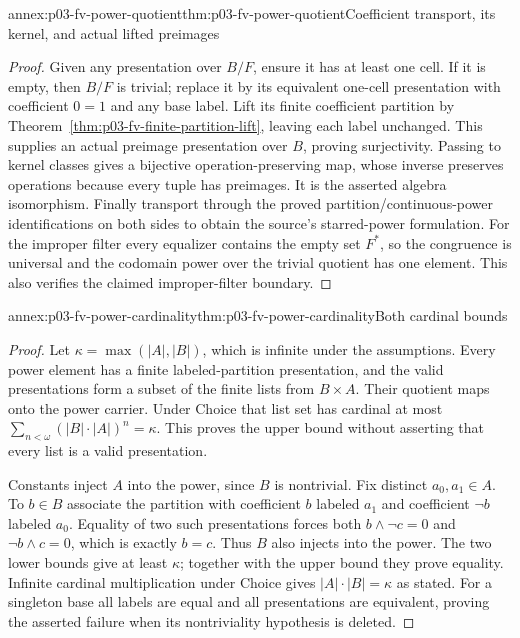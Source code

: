 \begin{annexitem}{annex:p03-fv-power-quotient}{thm:p03-fv-power-quotient}{Coefficient transport, its kernel, and actual lifted preimages}
\begin{proof}
Given any presentation over \(B/F\), ensure it has at least one cell.
If it is empty, then \(B/F\) is trivial; replace it by its equivalent
one-cell presentation with coefficient \(0=1\) and any base label.
Lift its finite coefficient
partition by Theorem~\ref{thm:p03-fv-finite-partition-lift}, leaving
each label unchanged. This supplies an actual preimage presentation over
\(B\), proving surjectivity. Passing to kernel classes gives a bijective
operation-preserving map, whose inverse preserves operations because every
tuple has preimages. It is the asserted algebra isomorphism. Finally
transport through the proved partition/continuous-power identifications
on both sides to obtain the source's starred-power formulation. For the
improper filter every equalizer contains the empty set \(F^*\), so the
congruence is universal and the codomain power over the trivial quotient
has one element. This also verifies the claimed improper-filter boundary.
\end{proof}
\end{annexitem}

\begin{annexitem}{annex:p03-fv-power-cardinality}{thm:p03-fv-power-cardinality}{Both cardinal bounds}
\begin{proof}
Let \(\kappa=\max(|A|,|B|)\), which is infinite under the assumptions.
Every power element has a finite labeled-partition presentation, and the
valid presentations form a subset of the finite lists from \(B\times A\).
Their quotient maps onto the power carrier.
Under Choice that list set has cardinal at most
\(\sum_{n<\omega}(|B|\cdot|A|)^n=\kappa\).
This proves the upper bound without asserting that every list is a valid
presentation.

Constants inject \(A\) into the power, since \(B\) is nontrivial.
Fix distinct \(a_0,a_1\in A\). To \(b\in B\) associate the
partition with coefficient \(b\) labeled \(a_1\) and coefficient
\(\neg b\) labeled \(a_0\). Equality of two such presentations
forces both \(b\wedge\neg c=0\) and \(\neg b\wedge c=0\),
which is exactly \(b=c\). Thus \(B\) also injects into the power.
The two lower bounds give at least \(\kappa\); together with the
upper bound they prove equality. Infinite cardinal multiplication under
Choice gives \(|A|\cdot|B|=\kappa\) as stated. For a singleton
base all labels are equal and all presentations are equivalent, proving
the asserted failure when its nontriviality hypothesis is deleted.
\end{proof}
\end{annexitem}
